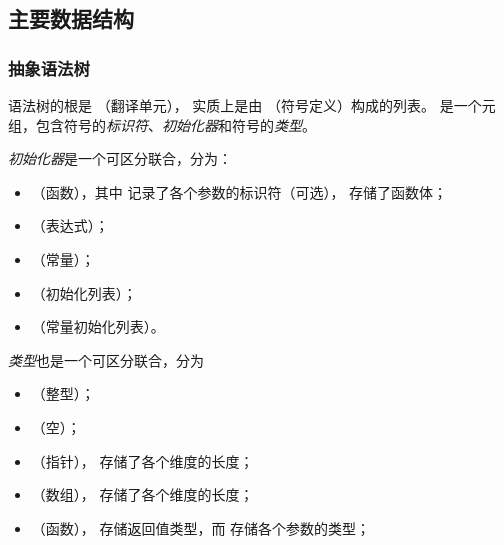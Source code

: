 \subsection{主要数据结构}
\subsubsection{抽象语法树}

语法树的根是 （翻译单元）， 实质上是由 （符号定义）构成的列表。 是一个元组，包含符号的\textit{标识符}、\textit{初始化器}和符号的\textit{类型}。

\textit{初始化器}是一个可区分联合，分为：
\begin{itemize}
    \item {}（函数），其中  记录了各个参数的标识符（可选）， 存储了函数体；
    \item {}（表达式）；
    \item {}（常量）；
    \item {}（初始化列表）；
    \item {}（常量初始化列表）。
\end{itemize}

\textit{类型}也是一个可区分联合，分为
\begin{itemize}
    \item {}（整型）；
    \item {}（空）；
    \item {}（指针）， 存储了各个维度的长度；
    \item {}（数组）， 存储了各个维度的长度；
    \item {}（函数）， 存储返回值类型，而  存储各个参数的类型；
\end{itemize}

